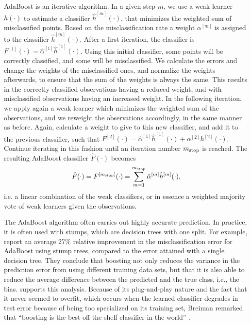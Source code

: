 AdaBoost is an iterative algorithm.
In a given step $m$, we use a weak learner $h(\cdot)$ to estimate a classifier $\hat{h}^{[m]}(\cdot)$, that minimizes the weighted sum of misclassified points.
Based on the misclassification rate a weight $\alpha^{[m]}$ is assigned to the classifier $\hat{h}^{[m]}(\cdot)$.
After a first iteration, the classifier is $F^{[1]}(\cdot)=\hat{\alpha}^{[1]}\hat{h}^{[1]}(\cdot)$.
Using this initial classifier, some points will be correctly classified, and some will be misclassified.
We calculate the errors and change the weights of the misclassified ones, and normalize the weights afterwards, to ensure that the sum of the weights is always the same.
This results in the correctly classified observations having a reduced weight, and with misclassified observations having an increased weight.
In the following iteration, we apply again a weak learner which minimizes the weighted sum of the observations, and we reweight the observations accordingly, in the same manner as before.
Again, calculate a weight to give to this new classifier, and add it to the previous classifier, such that $F^{[2]}(\cdot)=\hat{\alpha}^{[1]}\hat{h}^{[1]}(\cdot)+\alpha^{[2]}h^{[2]}(\cdot)$.
Continue iterating in this fashion until an iteration number $m_{\text{stop}}$ is reached.
The resulting AdaBoost classifier $\hat{F}(\cdot)$ becomes
\begin{equation*}
    \hat{F}(\cdot)=F^{[m_{\text{stop}}]}(\cdot)=\sum_{m=1}^{m_{\text{stop}}}\hat{\alpha}^{[m]}\hat{h}^{[m]}(\cdot),
\end{equation*}
i.e. a linear combination of the weak classifiers, or in essence a weighted majority vote of weak learners given the observations.

The AdaBoost algorithm often carries out highly accurate prediction.
In practice, it is often used with stumps, which are decision trees with one split.
For example, \citet{bauer-kohavi} report an average 27\% relative improvement in the misclassification error for AdaBoost using stump trees, compared to the error attained with a single decision tree.
They conclude that boosting not only reduces the variance in the prediction error from using different training data sets, but that it is also able to reduce the average difference between the predicted and the true class, i.e., the bias.
\citet{breiman1998} supports this analysis.
Because of its plug-and-play nature and the fact that it never seemed to overfit, which occurs when the learned classifier degrades in test error because of being too specialized on its training set, Breiman remarked that ``boosting is the best off-the-shelf classifier in the world'' \citep{ESL}.

